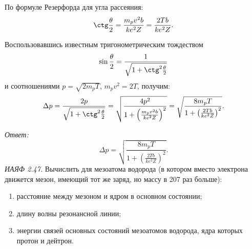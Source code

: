 По формуле Резерфорда для угла рассеяния:
\[
    \ctg\frac{\theta}{2} = \frac{m_pv^2b}{ke^2Z} = \frac{2Tb}{ke^2Z}.
\]

Воспользовавшись известным тригонометрическим тождеством
\[
    \sin\frac{\theta}{2} = \frac{1}{\sqrt{1 + \ctg^2\frac{\theta}{2}}}
\]
и соотношениями \( p = \sqrt{2m_pT} \), \( m_pv^2 = 2T \), получим:
\[
    \Delta p = \frac{2p}{\sqrt{1 + \ctg^2\frac{\theta}{2}}} = \sqrt{\frac{4p^2}
    {1 + \left(\frac{m_pv^2b}{ke^2Z}\right)^2}} = \sqrt{\frac{8m_pT}{1 + \left(
    \frac{2Tb}{ke^2Z}\right)^2}}.
\]

\vspace*{2em}
\emph{Ответ:}
\vspace*{-1.7em}
\[
    \Delta p = \sqrt{\frac{8m_pT}{1 + \left(\frac{2Tb}{ke^2Z}\right)^2}}.
\]
\newpage
\emph{ИАЯФ 2.47.}
Вычислить для мезоатома водорода (в котором вместо электрона движется мезон,
имеющий тот же заряд, но массу в 207 раз больше):
\vspace*{-2em}
\begin{enumerate} \itemsep-.5em
    \item расстояние между мезоном и ядром в основном состоянии;
    \item длину волны резонансной линии;
    \item энергии связей основных состояний мезоатомов водорода, ядра которых
    протон и дейтрон.
\end{enumerate}

